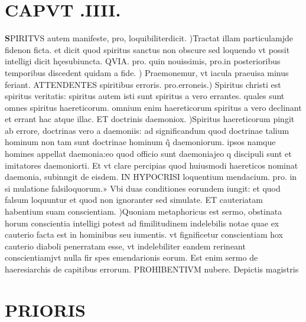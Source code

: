 \documentclass{article}
\begin{document}
\begin{pages}
\endnumbering\beginnumbering\section{CAPVT .IIII.}\pstart \huge\textbf{S}\normalsize PIRITVS autem manifeste, pro, loquibiliterdicit. )Tractat illam particulamjde fidenon ficta. et dicit quod spiritus sanctus non obscure sed loquendo vt possit intelligi dicit hçesubiuncta. QVIA. pro. quin nouissimis, pro.in posterioribus temporibus discedent quidam a fide. ) Praemonemur, vt iacula praeuisa minus feriant. ATTENDENTES spiritibus erroris. pro.erroneis.) Spiritus christi est spiritus veritatis: spiritus autem isti sunt spiritus a vero errantes. quales sunt omnes spiritus haereticorum. omnium enim haereticorum spiritus a vero declinant et errant hac atque illac. ET doctrinis daemoniox. )Spiritus haereticorum pingit ab errore, doctrinas vero a daemoniis: ad significandum quod doctrinae talium hominum non tam sunt doctrinae hominum q̃ daemoniorum. ipsos namque homines appellat daemonia:eo quod officio sunt daemoniajeo q discipuli sunt et imitatores daemoniorti. Et vt clare percipias quod huiusmodi haereticos nominat daemonia, subinngit de eisdem. IN HYPOCRISI loquentium mendacium. pro. in si mulatione falsiloquorum.» Vbi duas conditiones eorundem iungit: et quod falsum loquuntur et quod non ignoranter sed simulate. ET cauteriatam habentium suam conscientiam. )Quoniam metaphoricus est sermo, obstinata horum conscientia intelligi potest ad fimilitudinem indelebilis notae quae ex cauterio facta est in hominibus seu iumentis. vt fignificetur conscientiam hox cauterio diaboli penerratam esse, vt indelebiliter eandem rerineant conscientiamjvt nulla fir spes emendarionis eorum. Est enim sermo de haeresiarchis de capitibus errorum. PROHIBENTIVM nubere. Depictis magistris  \pend
\section*{PRIORIS }

\end{pages}
\end{document}
